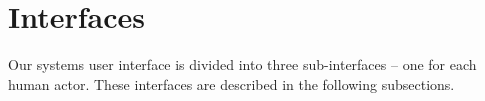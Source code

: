 \section{Interfaces}
\label{sec:interfaces}
Our systems user interface is divided into three sub-interfaces -- one for each human actor.
These interfaces are described in the following subsections.



